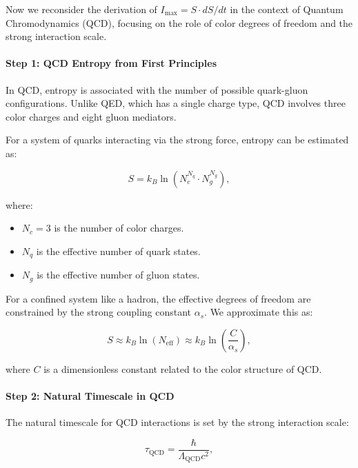 \documentclass[12pt]{article}
\begin{document}
Now we reconsider the derivation of $I_{\max} = S \cdot dS/dt$ in the context of Quantum Chromodynamics (QCD), focusing on the role of color degrees of freedom and the strong interaction scale.

\paragraph{Step 1: QCD Entropy from First Principles}

In QCD, entropy is associated with the number of possible quark-gluon configurations. Unlike QED, which has a single charge type, QCD involves three color charges and eight gluon mediators.

For a system of quarks interacting via the strong force, entropy can be estimated as:

\begin{equation}
    S = k_B \ln(N_c^{N_q} \cdot N_g^{N_g}),
\end{equation}

where:
\begin{itemize}
    \item $N_c = 3$ is the number of color charges.
    \item $N_q$ is the effective number of quark states.
    \item $N_g$ is the effective number of gluon states.
\end{itemize}

For a confined system like a hadron, the effective degrees of freedom are constrained by the strong coupling constant $\alpha_s$. We approximate this as:

\begin{equation}
    S \approx k_B \ln(N_{\text{eff}}) \approx k_B \ln\left(\frac{C}{\alpha_s}\right),
\end{equation}

where $C$ is a dimensionless constant related to the color structure of QCD.

\paragraph{Step 2: Natural Timescale in QCD}

The natural timescale for QCD interactions is set by the strong interaction scale:

\begin{equation}
    \tau_{\text{QCD}} = \frac{\hbar}{\Lambda_{\text{QCD}}c^2},
\end{equation}
\end{document}

